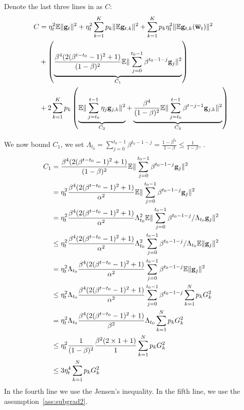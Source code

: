 Denote the last three lines in \eq{\ref{eq:nagcvx7}} as $C$: 
\begin{align}
C &= \eta_t^2\mathbb{E}\|{\mathbf{g}}_t\|^2 +\eta^2_t \sum_{k=1}^K p_k\|\mathbb{E} {\mathbf{g}}_{t,k}\|^2+ \sum_{k=1}^K p_k \eta_t^2 \|\mathbb{E} {\mathbf{g}}_{t,k}(\overline{{\mathbf{w}}}_t)\|^2  \nonumber \\
	& +  \left(\underbrace{\frac{\beta^4(2(\beta^{t-t_0}-1)^2 + 1)}{(1-\beta)^2} \mathbb{E}\|\sum_{j=0}^{t_0 - 1}\beta^{t_0-1-j}{\mathbf{g}}_j\|^2}_{C_1} \right) \nonumber\\
	& + 2\sum_{k=1}^K p_k \left(\underbrace{\mathbb{E} \|\sum_{j=t_0}^{t-1}\eta_j {\mathbf{g}}_{j,k}\|^2 }_{C_2} + \underbrace{\frac{\beta^4}{(1 - \beta)^2} \mathbb{E}\|\sum_{j=t_0}^{t-1}\beta^{t-j-1}{\mathbf{g}}_{j,k}\|^2}_{C_3} \right)  \label{eq:nagcvxc}
\end{align}



We now bound $C_1$, we set $\Lambda_{t_0} = \sum_{j=0}^{t_0 - 1}\beta^{t_0-1-j} = \frac{1 - \beta^{t_0}}{1- \beta} \leq \frac{1}{1 - \beta}$, .
\begin{align}
	C_1 &=  \frac{\beta^4(2(\beta^{t-t_0}-1)^2 + 1)}{(1-\beta)^2} \mathbb{E}\|\sum_{j=0}^{t_0 - 1}\beta^{t_0-1-j}{\mathbf{g}}_j\|^2\\
        &= \eta_t^2 \frac{\beta^4(2(\beta^{t-t_0}-1)^2 + 1)}{\alpha^2} \mathbb{E}\|\sum_{j=0}^{t_0 - 1}\beta^{t_0-1-j}{\mathbf{g}}_j\|^2\\
        &= \eta_t^2  \frac{\beta^4(2(\beta^{t-t_0}-1)^2 + 1)}{\alpha^2}\Lambda_{t_0}^2 \mathbb{E}\|\sum_{j=0}^{t_0 - 1}\beta^{t_0-1-j}/\Lambda_{t_0} {\mathbf{g}}_j\|^2\\
        & \leq \eta_t^2  \frac{\beta^4(2(\beta^{t-t_0}-1)^2 + 1)}{\alpha^2}\Lambda_{t_0}^2 \sum_{j=0}^{t_0 - 1}\beta^{t_0-1-j}/\Lambda_{t_0}\mathbb{E}\| {\mathbf{g}}_j\|^2\\ 
        & = \eta_t^2 \Lambda_{t_0} \frac{\beta^4(2(\beta^{t-t_0}-1)^2 + 1)}{\alpha^2} \sum_{j=0}^{t_0 - 1}\beta^{t_0-1-j} \mathbb{E}\| {\mathbf{g}}_j\|^2\\
		& \leq  \eta_t^2 \Lambda_{t_0} \frac{\beta^4(2(\beta^{t-t_0}-1)^2 + 1)}{\alpha^2} \sum_{j=0}^{t_0 - 1}\beta^{t_0-1-j} \sum_{k=1}^N p_k G_k^2   \\
		& =  \eta_t^2 \Lambda_{t_0} \frac{\beta^4(2(\beta^{t-t_0}-1)^2 + 1)}{\beta^2} \Lambda_{t_0}  \sum_{k=1}^N p_k G_k^2  \\
		& \leq  \eta_t^2 \frac{1}{(1-\beta)^2} \frac{\beta^2(2 \times 1 + 1)}{1} \sum_{k=1}^N p_k G_k^2   \\
		& \leq  3 \eta_t^4\sum_{k=1}^N p_k G_k^2   \label{eq:nagcvxc1}
\end{align}
In the fourth line we use the Jensen's inequality. In the fifth line, we use the assumption~\ref{ass:subgrad2}. 


